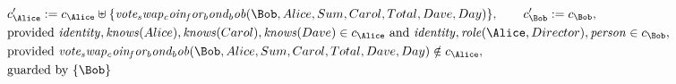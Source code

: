 \begin{align*}
&
c'_
{
\Alice
}
 := 
c_
{
\Alice
}
 \uplus 
\{
\mathit{
vote_swap_coin_for_bond_bob
}
(
\Bob
,
Alice
,
Sum
,
Carol
,
Total
,
Dave
,
Day
)
\}
, \qquad 
c'_
{
\Bob
}
 := 
c_
{
\Bob
}
,\\
&
\text{provided } 
\mathit{
identity
}
,
\mathit{
knows
}
(
Alice
)
,
\mathit{
knows
}
(
Carol
)
,
\mathit{
knows
}
(
Dave
)
 \in c_
{
\Alice
}
 \text{ and } 
\mathit{
identity
}
,
\mathit{
role
}
(
\Alice
,
Director
)
,
\mathit{
person
}
 \in c_
{
\Bob
}
,\\
&
\text{provided } 
\mathit{
vote_swap_coin_for_bond_bob
}
(
\Bob
,
Alice
,
Sum
,
Carol
,
Total
,
Dave
,
Day
)
 \notin c_
{
\Alice
}
,\\
&
\text{guarded by } \{
\Bob
\}
\end{align*}

